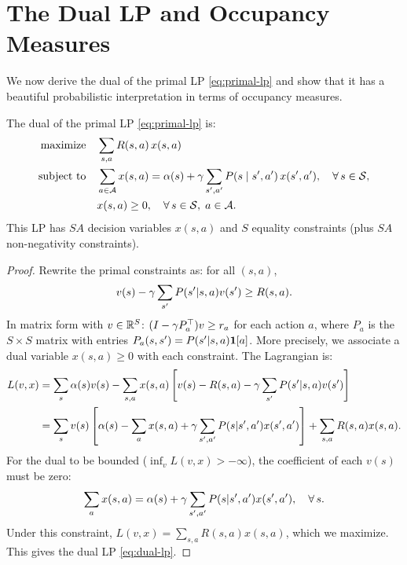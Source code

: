 \documentclass[11pt,a4paper]{article}
\begin{document}

\section{The Dual LP and Occupancy Measures}
\label{sec:dual-lp}

We now derive the dual of the primal LP \eqref{eq:primal-lp} and
show that it has a beautiful probabilistic interpretation in terms
of occupancy measures.

\begin{theorem}
\label{thm:dual-lp}
The dual of the primal LP \eqref{eq:primal-lp} is:
\begin{equation}
\label{eq:dual-lp}
\begin{aligned}
    \text{maximize} \quad & \sum_{s,a} R(s,a)\, x(s,a) \\
    \text{subject to} \quad & \sum_{a \in \mathcal{A}} x(s,a)
    = \alpha(s) + \gamma \sum_{s',a'} P(s \mid s',a')\,
    x(s',a'), \quad \forall\, s \in \mathcal{S}, \\
    & x(s,a) \geq 0, \quad \forall\, s \in \mathcal{S},\;
    a \in \mathcal{A}.
\end{aligned}
\end{equation}
This LP has $SA$ decision variables $x(s,a)$ and $S$ equality
constraints (plus $SA$ non-negativity constraints).
\end{theorem}

\begin{proof}
Rewrite the primal constraints as: for all $(s,a)$,
\[
    v(s) - \gamma \sum_{s'} P(s'|s,a) v(s') \geq R(s,a).
\]
In matrix form with $v \in \mathbb{R}^S$: $(I - \gamma P_a^\top) v \geq
r_a$ for each action $a$, where $P_a$ is the $S \times S$ matrix
with entries $P_a(s,s') = P(s'|s,a) \mathbf{1}[a]$.
More precisely, we associate a dual variable $x(s,a) \geq 0$
with each constraint. The Lagrangian is:
\begin{align*}
    L(v, x) &= \sum_s \alpha(s) v(s) - \sum_{s,a} x(s,a)
    \left[ v(s) - R(s,a) - \gamma \sum_{s'} P(s'|s,a) v(s')
    \right] \\
    &= \sum_s v(s) \left[ \alpha(s) - \sum_a x(s,a)
    + \gamma \sum_{s',a'} P(s|s',a') x(s',a') \right]
    + \sum_{s,a} R(s,a) x(s,a).
\end{align*}
For the dual to be bounded ($\inf_v L(v,x) > -\infty$), the
coefficient of each $v(s)$ must be zero:
\[
    \sum_a x(s,a) = \alpha(s) + \gamma \sum_{s',a'}
    P(s|s',a') x(s',a'), \quad \forall\, s.
\]
Under this constraint, $L(v,x) = \sum_{s,a} R(s,a) x(s,a)$, which
we maximize. This gives the dual LP \eqref{eq:dual-lp}.
\end{proof}
\end{document}
